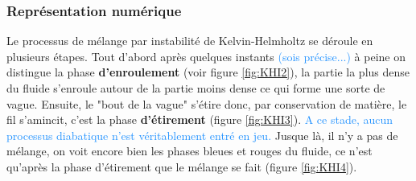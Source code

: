 \documentclass{rapportECC}
\newcommand{\FAadd}[1]{\textcolor{DodgerBlue}{{#1}}}                     %
\begin{document}
\subsubsection{Représentation numérique}
Le processus de mélange par instabilité de Kelvin-Helmholtz se déroule en plusieurs étapes. Tout d'abord après quelques instants \FAadd{(sois précise...)} à peine on distingue la phase \textbf{d'enroulement} (voir figure \ref{fig:KHI2}), la partie la plus dense du fluide s'enroule autour de la partie moins dense ce qui forme une sorte de vague. Ensuite, le "bout de la vague" s'étire donc, par conservation de matière, le fil s'amincit, c'est la phase \textbf{d'étirement} (figure \ref{fig:KHI3}). \FAadd{A ce stade, aucun processus diabatique n'est véritablement entré en jeu.} Jusque là, il n'y a pas de mélange, on voit encore bien les phases bleues et rouges du fluide, ce n'est qu'après la phase d'étirement que le mélange se fait (figure \ref{fig:KHI4}).
\end{document}
